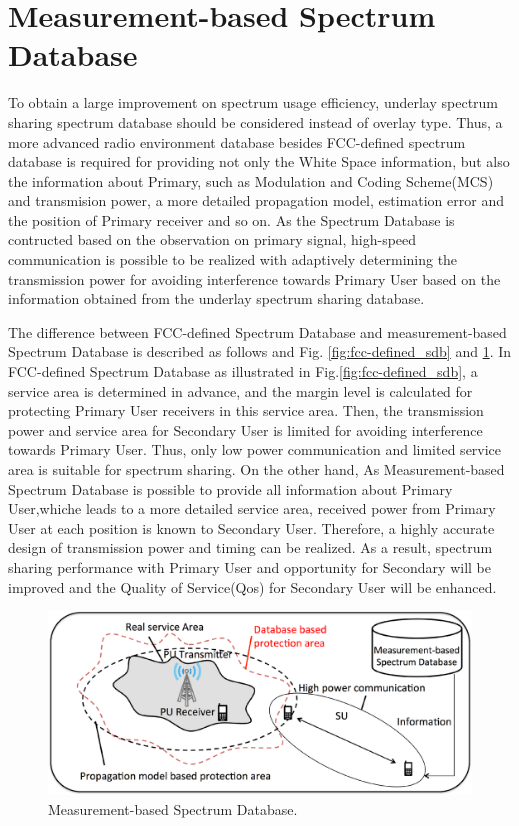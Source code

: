 \section{Measurement-based Spectrum Database}
To obtain a large improvement on spectrum usage efficiency, underlay spectrum sharing spectrum database should be considered instead of overlay type. Thus, a more advanced radio environment database besides FCC-defined spectrum database is required for providing not only the White Space information, but also the information about Primary, such as Modulation and Coding Scheme(MCS) and transmision power, a more detailed propagation model, estimation error and the position of Primary receiver and so on. As the Spectrum Database is contructed based on the observation on primary signal, high-speed communication is possible to be realized  with adaptively determining the transmission power for avoiding interference towards Primary User based on the information obtained from the underlay spectrum sharing database.

The difference between FCC-defined Spectrum Database and measurement-based Spectrum Database is described as follows and Fig. \ref{fig:fcc-defined_sdb} and \ref{fig:asdb}. In FCC-defined Spectrum Database as illustrated in Fig.\ref{fig:fcc-defined_sdb}, a service area is determined in advance, and the margin level is calculated for protecting Primary User receivers in this service area. Then, the transmission power and service area for Secondary User is limited for avoiding interference towards Primary User. Thus, only low power communication and limited service area is suitable for spectrum sharing. On the other hand, As Measurement-based Spectrum Database is possible to provide all information about Primary User,whiche leads to a more detailed service area, received power from Primary User at each position is known to Secondary User. Therefore, a highly accurate design of transmission power and timing can be realized. As a result, spectrum sharing  performance with Primary User and opportunity for Secondary will be improved and the Quality of Service(Qos) for Secondary User will be enhanced. 

\begin{figure}[!htp]
\begin{center}
\includegraphics[width=150mm,clip]{asdb.eps}
\caption{Measurement-based Spectrum Database.}
\label{fig:asdb}
\end{center}
\end{figure}

